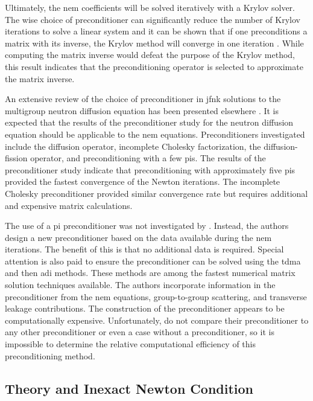       Ultimately, the \gls{nem} coefficients will be solved iteratively with a
      Krylov solver. The wise choice of preconditioner can significantly reduce 
      the number of Krylov iterations to solve a linear system and it can be
      shown that if one preconditions a matrix with its inverse, the Krylov
      method will converge in one iteration \cite{textbookkelley}. While
      computing the matrix inverse would defeat the purpose of the Krylov
      method, this result indicates that the preconditioning operator is
      selected to approximate the matrix inverse.

      An extensive review of the choice of preconditioner in \gls{jfnk}
      solutions to the multigroup neutron diffusion equation has been presented
      elsewhere \cite{gill_azmy}. It is expected that the results of the
      preconditioner study for the neutron diffusion equation should be
      applicable to the \gls{nem} equations. Preconditioners investigated
      include the diffusion operator, incomplete Cholesky factorization, the
      diffusion-fission operator, and preconditioning with a few \glspl{pi}.
      The results of the preconditioner study indicate that preconditioning with
      approximately five \glspl{pi} provided the fastest convergence of the
      Newton iterations. The incomplete Cholesky preconditioner provided similar
      convergence rate but requires additional and expensive matrix
      calculations.

      The use of a \gls{pi} preconditioner was not investigated by
      \citeauthor{qe2paper}. Instead, the authors design a new
      preconditioner based on the data available during the \gls{nem}
      iterations. The benefit of this is that no additional data is required.
      Special attention is also paid to ensure the preconditioner can be solved
      using the \gls{tdma} and then \gls{adi} methods. These methods are among
      the fastest numerical matrix solution techniques available. The authors
      incorporate information in the preconditioner from the \gls{nem}
      equations, group-to-group scattering, and transverse leakage
      contributions. The construction of the preconditioner appears to be 
      computationally expensive. Unfortunately, \citeauthor{qe2paper} do not
      compare their preconditioner to any other preconditioner or even a case
      without a preconditioner, so it is impossible to determine the relative
      computational efficiency of this preconditioning method.

  \subsection{ Theory and Inexact Newton Condition}

